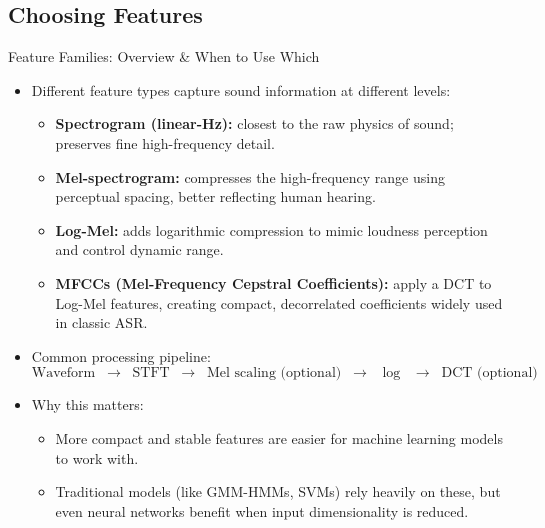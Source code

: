 \subsection{Choosing Features}
\begin{frame}[allowframebreaks]{Feature Families: Overview \& When to Use Which}

    \begin{itemize}
        \item Different feature types capture sound information at different levels:
        \begin{itemize}
            \item \textbf{Spectrogram (linear-Hz):} closest to the raw physics of sound; preserves fine high-frequency detail.
            \item \textbf{Mel-spectrogram:} compresses the high-frequency range using perceptual spacing, better reflecting human hearing.
            \item \textbf{Log-Mel:} adds logarithmic compression to mimic loudness perception and control dynamic range.
            \item \textbf{MFCCs (Mel-Frequency Cepstral Coefficients):} apply a DCT to Log-Mel features, creating compact, decorrelated coefficients widely used in classic ASR.
        \end{itemize}
\framebreak
        \item Common processing pipeline:
        \[
            \text{Waveform} \;\;\rightarrow\;\; \text{STFT} \;\;\rightarrow\;\; \text{Mel scaling (optional)} \;\;\rightarrow\;\; \log \;\;\rightarrow\;\; \text{DCT (optional)}
        \]

        \item Why this matters:
        \begin{itemize}
            \item More compact and stable features are easier for machine learning models to work with.
            \item Traditional models (like GMM-HMMs, SVMs) rely heavily on these, but even neural networks benefit when input dimensionality is reduced.
        \end{itemize}
    \end{itemize}

\end{frame}

